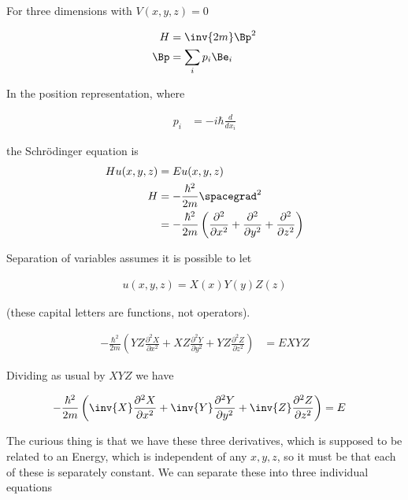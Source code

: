 %
%
For three dimensions with $V(x,y,z) = 0$

\begin{align*}
H &= \inv{2m} \Bp^2 \\
\Bp &= \sum_i p_i \Be_i \\
\end{align*}

In the position representation, where

\begin{align*}
p_i &= -i \hbar \frac{d}{dx_i}
\end{align*}

the Schr\"{o}dinger equation is
\begin{align*}
H u(x,y,z) &= E u(x,y,z) \\
H &= -\frac{\hbar^2}{2m} \spacegrad^2 \\
&= -\frac{\hbar^2}{2m} \left(
\frac{\partial^2}{\partial {x}^2}
+\frac{\partial^2}{\partial {y}^2}
+\frac{\partial^2}{\partial {z}^2}
\right)
\end{align*}

Separation of variables assumes it is possible to let

\begin{align*}
u(x,y,z) = X(x) Y(y) Z(z)
\end{align*}

(these capital letters are functions, not operators).

\begin{align*}
-\frac{\hbar^2}{2m} \left(
YZ \frac{\partial^2 X}{\partial {x}^2}
+ XZ \frac{\partial^2 Y}{\partial {y}^2}
+ YZ \frac{\partial^2 Z}{\partial {z}^2}\right)
&= E X Y Z
\end{align*}

Dividing as usual by $XYZ$ we have

\begin{align*}
-\frac{\hbar^2}{2m} \left(
\inv{X} \frac{\partial^2 X}{\partial {x}^2}
+ \inv{Y} \frac{\partial^2 Y}{\partial {y}^2}
+ \inv{Z} \frac{\partial^2 Z}{\partial {z}^2} \right)
&= E
\end{align*}

The curious thing is that we have these three derivatives, which is supposed to be related to an Energy, which is independent of any $x,y,z$, so it must be that each of these is separately constant.  We can separate these into three individual equations

